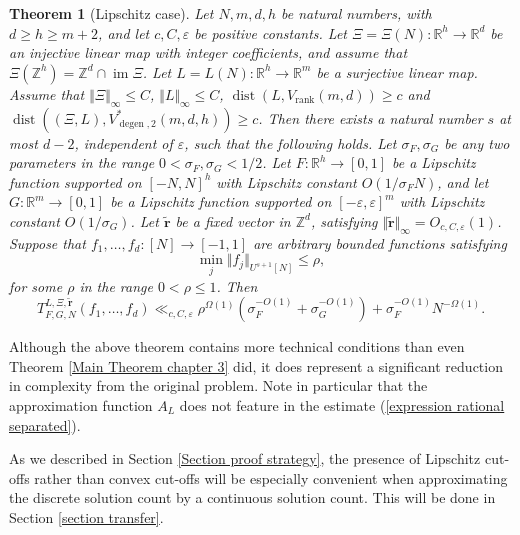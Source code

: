 \documentclass[12pt,a4paper,twoside,reqno]{amsart}
\newtheorem{Theorem}{Theorem}
\newcommand{\degen}{\operatorname{degen}}
\newcommand{\rank}{\operatorname{rank}}
\newcommand{\dist}{\operatorname{dist}}
\newcommand{\im}{\operatorname{im}}
\numberwithin{equation}{section}
\begin{document}
\begin{Theorem}[Lipschitz case]
\label{Theorem rational set out version}
Let $N,m,d, h$ be natural numbers, with $d\geqslant h\geqslant m+2$, and let $c,C,\varepsilon$ be positive constants. Let $\Xi = \Xi(N):\mathbb{R}^h\longrightarrow \mathbb{R}^d$ be an injective linear map with integer coefficients, and assume that $\Xi(\mathbb{Z}^{h}) = \mathbb{Z}^d \cap \im \Xi$. Let $L = L(N):\mathbb{R}^h \longrightarrow \mathbb{R}^m$ be a surjective linear map. Assume that $\Vert \Xi \Vert_\infty \leqslant C$, $\Vert L \Vert_\infty \leqslant C$, $\dist(L,V_{\rank}(m,d)) \geqslant c$ and $\dist((\Xi,L),V_{\degen,2}^*(m,d,h))\geqslant c$. Then there exists a natural number $s$ at most $d-2$, independent of $\varepsilon$, such that the following holds. Let $\sigma_F,\sigma_G$ be any two parameters in the range $0<\sigma_F,\sigma_G < 1/2$. Let $F:\mathbb{R}^h\longrightarrow [0,1]$ be a Lipschitz function supported on $[-N,N]^h$ with Lipschitz constant $O(1/\sigma_FN)$, and let $G:\mathbb{R}^{m}\longrightarrow [0,1]$ be a Lipschitz function supported on $[-\varepsilon,\varepsilon]^m$ with Lipschitz constant $O(1/\sigma_G)$. Let $\widetilde{\mathbf{r}}$ be a fixed vector in $\mathbb{Z}^d$, satisfying $\Vert \widetilde{\mathbf{r}}\Vert_\infty = O_{c,C,\varepsilon}(1)$. Suppose that $f_1,\dots,f_d:[N]\longrightarrow [-1,1]$ are arbitrary bounded functions satisfying  \[\min_j \Vert f_j\Vert_{U^{s+1}[N]} \leqslant \rho,\] for some $\rho$ in the range $0<\rho \leqslant 1$. Then
\begin{equation}
\label{expression rational separated}
 T^{L,\Xi,\widetilde{\mathbf{r}}}_{F,G,N}(f_1,\dots,f_{d})\ll_{c,C,\varepsilon}  \rho^{\Omega(1)} (\sigma_F^{-O(1)} + \sigma_G^{-O(1)}) + \sigma_F^{-O(1)}N^{-\Omega(1)}. 
\end{equation}
\end{Theorem}
Although the above theorem contains more technical conditions than even Theorem \ref{Main Theorem chapter 3} did, it does represent a significant reduction in complexity from the original problem. Note in particular that the approximation function $A_L$ does not feature in the estimate (\ref{expression rational separated}). 

As we described in Section \ref{Section proof strategy}, the presence of Lipschitz cut-offs rather than convex cut-offs will be especially convenient when approximating the discrete solution count by a continuous solution count. This will be done in Section \ref{section transfer}. \\
\end{document}
